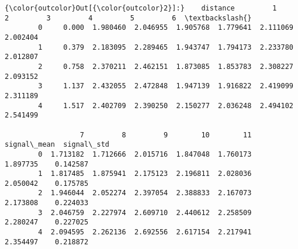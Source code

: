 \documentclass[11pt]{article}
\begin{document}
\begin{Verbatim}[commandchars=\\\{\}]
{\color{outcolor}Out[{\color{outcolor}2}]:}    distance         1         2         3         4         5         6  \textbackslash{}
        0     0.000  1.980460  2.046955  1.905768  1.779641  2.111069  2.002404   
        1     0.379  2.183095  2.289465  1.943747  1.794173  2.233780  2.012807   
        2     0.758  2.370211  2.462151  1.873085  1.853783  2.308227  2.093152   
        3     1.137  2.432055  2.472848  1.947139  1.916822  2.419099  2.311189   
        4     1.517  2.402709  2.390250  2.150277  2.036248  2.494102  2.541499   
        
                  7         8         9        10        11  signal\_mean  signal\_std  
        0  1.713182  1.712666  2.015716  1.847048  1.760173     1.897735    0.142587  
        1  1.817485  1.875941  2.175123  2.196811  2.028036     2.050042    0.175785  
        2  1.946044  2.052274  2.397054  2.388833  2.167073     2.173808    0.224033  
        3  2.046759  2.227974  2.609710  2.440612  2.258509     2.280247    0.227025  
        4  2.094595  2.262136  2.692556  2.617154  2.217941     2.354497    0.218872  
\end{Verbatim}
            
\end{document}
